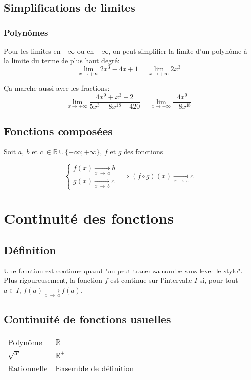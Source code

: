 \documentclass{article}
\newcommand{\R}{\mathds{R}}
\newcommand{\oo}{\infty}
\newcommand{\goesto}[2]{\xrightarrow[#1\:\to\:#2]{}}
\newcommand{\liminfty}{\lim_{x\to+\oo}}
\begin{document}
\subsection{Simplifications de limites}

\subsubsection{Polynômes}

Pour les limites en $+\oo$ ou en $-\oo$, on peut simplifier la limite d'un polynôme à la limite du terme de plus haut degré:
\[\liminfty 2x^3 - 4x + 1 = \liminfty 2x^3\]

Ça marche aussi avec les fractions:
\[\liminfty \frac{4x^9 + x^3 - 2}{5x^3 - 8x^{18} + 420} = \liminfty \frac{4x^9}{-8x^{18}}\]

\subsection{Fonctions composées}

Soit $a,\:b$ et $c\:\in \R \cup \{ -\oo; +\oo \}$, $f$ et $g$ des fonctions

$$\begin{cases}
f(x) \goesto{x}{a} b\\
g(x) \goesto{x}{b} c
\end{cases} \implies (f \circ g)(x) \goesto{x}{a} c$$

\newpage

\section{Continuité des fonctions}

\subsection{Définition}

Une fonction est continue quand "on peut tracer sa courbe sans lever le stylo". Plus rigoureusement, la fonction $f$ est continue sur l'intervalle $I$ si, pour tout $a \in I$, $f(a) \goesto{x}{a} f(a)$.

\subsection{Continuité de fonctions usuelles}

\begin{table}[H]
    \centering
    \begin{tabular}{ll}
         Polynôme & $\R$ \\
         $\sqrt{x}$ & $\R^+$ \\
         Rationnelle & Ensemble de définition \\
    \end{tabular}
\end{table}
\end{document}
